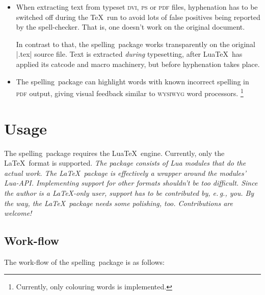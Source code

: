 \documentclass[11pt]{article}
\newcommand*{\pkg}{\textsf{spelling}}
\newcommand*{\acr}[1]{\mbox{\scshape#1}}
\newcommand*{\latinphrase}[1]{\foreignlanguage{latin}{\emph{#1}}}
\newcommand*{\lpeg}{\latinphrase{e.\,g.}\xspace}
\begin{document}
\begin{itemize}

\item When extracting text from typeset \acr{dvi}, \acr{ps} or \acr{pdf}
  files, hyphenation has to be switched off during the \TeX\ run to
  avoid lots of false positives being reported by the spell-checker.
  That is, one doesn't work on the original document.

  In contrast to that, the \pkg\ package works transparently on the
  original |.tex| source file.  Text is extracted \emph{during}
  typesetting, after Lua\TeX\ has applied its catcode and macro
  machinery, but before hyphenation takes place.

\item The \pkg\ package can highlight words with known incorrect
  spelling in \acr{pdf} output, giving visual feedback similar to
  \acr{wysiwyg} word processors.%
  \footnote{Currently, only colouring words is implemented.}

\end{itemize}


\section{Usage}
\label{sec:usage}

The \pkg\ package requires the Lua\TeX\ engine.  Currently, only the
\LaTeX\ format is supported.  \emph{The package consists of Lua modules
  that do the actual work.  The \LaTeX\ package is effectively a wrapper
  around the modules' Lua-API.  Implementing support for other formats
  shouldn't be too difficult.  Since the author is a \LaTeX-only user,
  support has to be contributed by, \lpeg, you.  By the way, the \LaTeX\
  package needs some polishing, too.  Contributions are welcome!}


\subsection{Work-flow}
\label{sec:work-flow}

The work-flow of the \pkg\ package is as follows:
\end{document}
